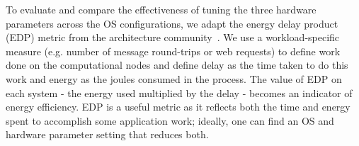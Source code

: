 
To evaluate and compare the effectiveness of tuning the three hardware parameters across the OS configurations, we adapt the energy delay product (EDP) metric from the architecture community~\cite{Gonzalez1996EnergyDI}.
We use a workload-specific measure (e.g. number of message round-trips or web requests) to define work done on the computational nodes and define delay as the time taken to do this work and energy as the joules consumed in the process. The value of EDP on each system - the energy used multiplied by the delay - becomes an indicator of energy efficiency. EDP is a useful metric as it reflects both the time and energy spent to accomplish some application work;  ideally, one can find an OS and hardware parameter setting that reduces both.



